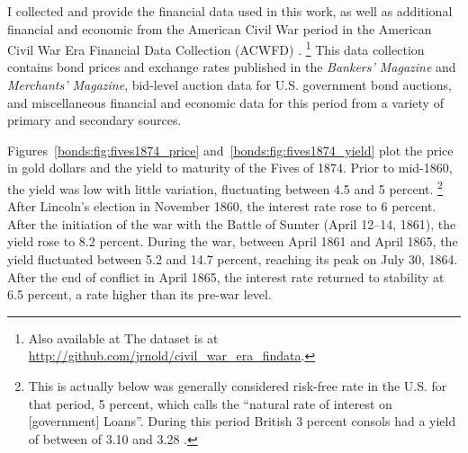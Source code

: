 I collected and provide the financial data used in this work, as well as additional financial and economic from the American Civil War period in the American Civil War Era Financial Data Collection (ACWFD) \parencite{Arnold2015a}.%
\footnote{Also available at The dataset is at \url{http://github.com/jrnold/civil_war_era_findata}.}
This data collection contains bond prices and exchange rates published in the \textit{Bankers' Magazine} and \textit{Merchants' Magazine}, bid-level auction data for U.S. government bond auctions, and miscellaneous financial and economic data for this period from a variety of primary and secondary sources.

Figures~\ref{bonds:fig:fives1874_price} and~\ref{bonds:fig:fives1874_yield} plot the price in gold dollars and the yield to maturity of the Fives of 1874.
Prior to mid-1860, the yield was low with little variation, fluctuating between 4.5 and 5 percent.%
\footnote{
  This is actually below was generally considered risk-free rate in the U.S. for that period, 5 percent, which \textcite[29]{Elder1863} calls the ``natural rate of interest on [government] Loans''.
  During this period British 3 percent consols had a yield of between of 3.10 and 3.28 \parencite[193]{HomerSylla2005}.
}
After Lincoln's election in November 1860,  the interest rate rose to 6 percent.
After the initiation of the war with the Battle of Sumter (April 12--14, 1861), the yield rose to 8.2 percent.
During the war, between April 1861 and April 1865, the yield fluctuated between 5.2 and 14.7 percent, reaching its peak on July 30, 1864.
After the end of conflict in April 1865, the interest rate returned to stability at 6.5 percent, a rate higher than its pre-war level.


